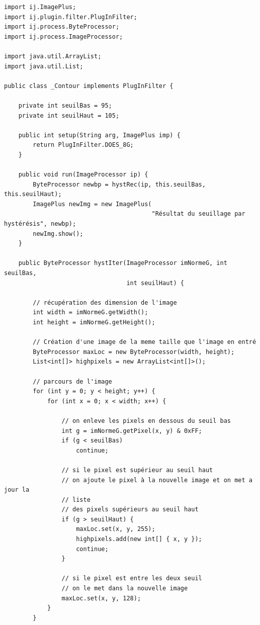 \documentclass[a4paper,11pt]{article}
\begin{document}
  \begin{lstlisting}[caption=Plugin pour le seuillage des maxima locaux par hystérésis]
import ij.ImagePlus;
import ij.plugin.filter.PlugInFilter;
import ij.process.ByteProcessor;
import ij.process.ImageProcessor;

import java.util.ArrayList;
import java.util.List;

public class _Contour implements PlugInFilter {

    private int seuilBas = 95;
    private int seuilHaut = 105;

    public int setup(String arg, ImagePlus imp) {
        return PlugInFilter.DOES_8G;
    }

    public void run(ImageProcessor ip) {
        ByteProcessor newbp = hystRec(ip, this.seuilBas, this.seuilHaut);
        ImagePlus newImg = new ImagePlus(
                                         "Résultat du seuillage par hystérésis", newbp);
        newImg.show();
    }

    public ByteProcessor hystIter(ImageProcessor imNormeG, int seuilBas,
                                  int seuilHaut) {

        // récupération des dimension de l'image
        int width = imNormeG.getWidth();
        int height = imNormeG.getHeight();

        // Création d'une image de la meme taille que l'image en entré
        ByteProcessor maxLoc = new ByteProcessor(width, height);
        List<int[]> highpixels = new ArrayList<int[]>();

        // parcours de l'image
        for (int y = 0; y < height; y++) {
            for (int x = 0; x < width; x++) {

                // on enleve les pixels en dessous du seuil bas
                int g = imNormeG.getPixel(x, y) & 0xFF;
                if (g < seuilBas)
                    continue;

                // si le pixel est supérieur au seuil haut
                // on ajoute le pixel à la nouvelle image et on met a jour la
                // liste
                // des pixels supérieurs au seuil haut
                if (g > seuilHaut) {
                    maxLoc.set(x, y, 255);
                    highpixels.add(new int[] { x, y });
                    continue;
                }

                // si le pixel est entre les deux seuil
                // on le met dans la nouvelle image
                maxLoc.set(x, y, 128);
            }
        }


\end{lstlisting}
\end{document}
